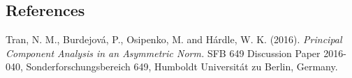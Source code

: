 \documentclass[12pt]{article}
\begin{document}
%
%
%

\subsection*{References}

\begin{description}

\item
Tran, N. M., Burdejov\'{a}, P., Osipenko, M. and H\'{a}rdle, W. K. (2016). \textit{Principal Component
Analysis in an Asymmetric Norm.} SFB 649 Discussion Paper 2016-040, Sonderforschungsbereich
649, Humboldt Universit\'{a}t zu Berlin, Germany.

\end{description}
\end{document}
